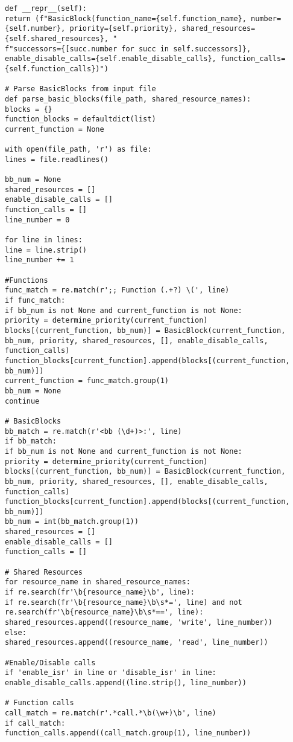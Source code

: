 \documentclass[
fancyheadings, %
%
%
]{stsreprt}
\begin{document}
{\begin{lstlisting}
def __repr__(self):
return (f"BasicBlock(function_name={self.function_name}, number={self.number}, priority={self.priority}, shared_resources={self.shared_resources}, "
f"successors={[succ.number for succ in self.successors]}, enable_disable_calls={self.enable_disable_calls}, function_calls={self.function_calls})")

# Parse BasicBlocks from input file
def parse_basic_blocks(file_path, shared_resource_names):
blocks = {}
function_blocks = defaultdict(list)
current_function = None

with open(file_path, 'r') as file:
lines = file.readlines()

bb_num = None
shared_resources = []
enable_disable_calls = []
function_calls = []
line_number = 0

for line in lines:
line = line.strip()
line_number += 1

#Functions
func_match = re.match(r';; Function (.+?) \(', line)
if func_match:
if bb_num is not None and current_function is not None:
priority = determine_priority(current_function)
blocks[(current_function, bb_num)] = BasicBlock(current_function, bb_num, priority, shared_resources, [], enable_disable_calls, function_calls)
function_blocks[current_function].append(blocks[(current_function, bb_num)])
current_function = func_match.group(1)
bb_num = None
continue

# BasicBlocks
bb_match = re.match(r'<bb (\d+)>:', line)
if bb_match:
if bb_num is not None and current_function is not None:
priority = determine_priority(current_function)
blocks[(current_function, bb_num)] = BasicBlock(current_function, bb_num, priority, shared_resources, [], enable_disable_calls, function_calls)
function_blocks[current_function].append(blocks[(current_function, bb_num)])
bb_num = int(bb_match.group(1))
shared_resources = []
enable_disable_calls = []
function_calls = []

# Shared Resources
for resource_name in shared_resource_names:
if re.search(fr'\b{resource_name}\b', line):
if re.search(fr'\b{resource_name}\b\s*=', line) and not re.search(fr'\b{resource_name}\b\s*==', line):
shared_resources.append((resource_name, 'write', line_number))
else:
shared_resources.append((resource_name, 'read', line_number))

#Enable/Disable calls
if 'enable_isr' in line or 'disable_isr' in line:
enable_disable_calls.append((line.strip(), line_number))

# Function calls
call_match = re.match(r'.*call.*\b(\w+)\b', line)
if call_match:
function_calls.append((call_match.group(1), line_number))


\end{lstlisting}}
\end{document}
